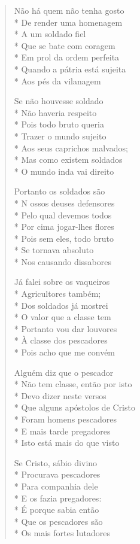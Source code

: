 \begin{verse}
Não há quem não tenha gosto\\*
De render uma homenagem\\*
A um soldado fiel\\*
Que se bate com coragem\\*
Em prol da ordem perfeita\\*
Quando a pátria está sujeita\\*
Aos pés da vilanagem

Se não houvesse soldado\\*
Não haveria respeito\\*
Pois todo bruto queria\\*
Trazer o mundo sujeito\\*
Aos seus caprichos malvados;\\*
Mas como existem soldados\\*
O mundo inda vai direito

Portanto os soldados são\\*
N ossos deuses defensores\\*
Pelo qual devemos todos\\*
Por cima jogar-lhes flores\\*
Pois sem eles, todo bruto\\*
Se tornava absoluto\\*
Nos causando dissabores

Já falei sobre os vaqueiros\\*
Agricultores também;\\*
Dos soldados já mostrei\\*
O valor que a classe tem\\*
Portanto vou dar louvores\\*
À classe dos pescadores\\*
Pois acho que me convém

Alguém diz que o pescador\\*
Não tem classe, então por isto\\*
Devo dizer neste versos\\*
Que alguns apóstolos de Cristo\\*
Foram homens pescadores\\*
E mais tarde pregadores\\*
Isto está mais do que visto

Se Cristo, sábio divino\\*
Procurava pescadores\\*
Para companhia dele\\*
E os fazia pregadores:\\*
É porque sabia então\\*
Que os pescadores são\\*
Os mais fortes lutadores


\end{verse}
